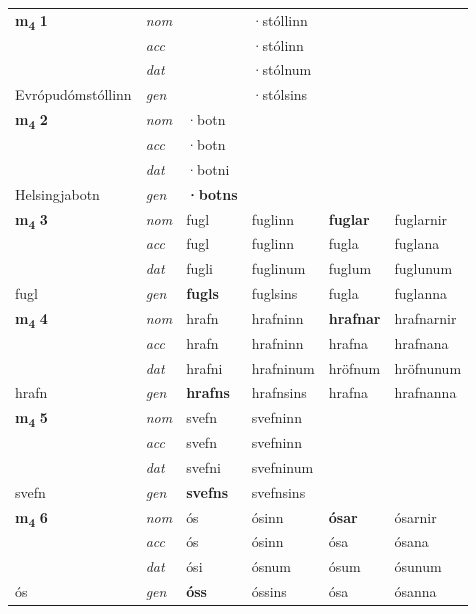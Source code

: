 \begin{longtable}[l]{X>{\footnotesize\itshape}XXXXX}
\multirow{3}{*}{{{\textbf{m{\textsubscript{4}}} \Large{\textbf{1}}}}}  
 & nom &  & ·stóllinn    & \textbf{} &   \\*
 & acc &   & ·stólinn   &   &  \\*
 & dat &  & ·stólnum   &  &  \\*
 {\footnotesize{Evrópudómstóllinn}} &  gen & \textbf{}  & ·stólsins  &  &  \\
\cmidrule{1-6}


\multirow{3}{*}{{{\textbf{m{\textsubscript{4}}} \Large{\textbf{2}}}}}  
 & nom & ·botn &     & \textbf{} &   \\*
 & acc & ·botn  &    &   &  \\*
 & dat & ·botni &    &  &  \\*
 {\footnotesize{Helsingjabotn}} &  gen & \textbf{·botns}  &   &  &  \\
\cmidrule{1-6}


\multirow{3}{*}{{{\textbf{m{\textsubscript{4}}} \Large{\textbf{3}}}}}  
 & nom & fugl & fuglinn    & \textbf{fuglar} & fuglarnir  \\*
 & acc & fugl  & fuglinn   & fugla  & fuglana \\*
 & dat & fugli & fuglinum   & fuglum & fuglunum \\*
 {\footnotesize{fugl}} &  gen & \textbf{fugls}  & fuglsins  & fugla & fuglanna \\
\cmidrule{1-6}


\multirow{3}{*}{{{\textbf{m{\textsubscript{4}}} \Large{\textbf{4}}}}}  
 & nom & hrafn & hrafninn    & \textbf{hrafnar} & hrafnarnir  \\*
 & acc & hrafn  & hrafninn   & hrafna  & hrafnana \\*
 & dat & hrafni & hrafninum   & hröfnum & hröfnunum \\*
 {\footnotesize{hrafn}} &  gen & \textbf{hrafns}  & hrafnsins  & hrafna & hrafnanna \\
\cmidrule{1-6}


\multirow{3}{*}{{{\textbf{m{\textsubscript{4}}} \Large{\textbf{5}}}}}  
 & nom & svefn & svefninn    & \textbf{} &   \\*
 & acc & svefn  & svefninn   &   &  \\*
 & dat & svefni & svefninum   &  &  \\*
 {\footnotesize{svefn}} &  gen & \textbf{svefns}  & svefnsins  &  &  \\
\cmidrule{1-6}


\multirow{3}{*}{{{\textbf{m{\textsubscript{4}}} \Large{\textbf{6}}}}}  
 & nom & ós & ósinn    & \textbf{ósar} & ósarnir  \\*
 & acc & ós  & ósinn   & ósa  & ósana \\*
 & dat & ósi & ósnum   & ósum & ósunum \\*
 {\footnotesize{ós}} &  gen & \textbf{óss}  & óssins  & ósa & ósanna \\
\cmidrule{1-6}



\end{longtable}
